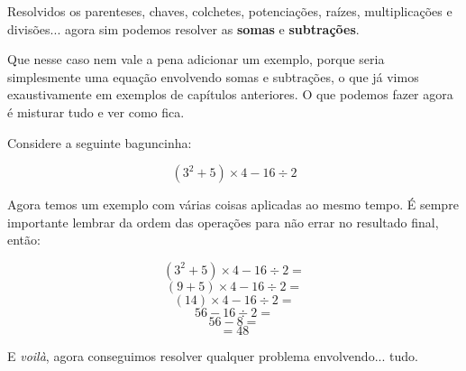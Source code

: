 \begin{tcolorbox}[title = Somas e Subtrações]
    Resolvidos os parenteses, chaves, colchetes, potenciações, raízes, multiplicações e divisões... agora sim podemos resolver as \textbf{somas} e \textbf{subtrações}.
\end{tcolorbox}

Que nesse caso nem vale a pena adicionar um exemplo, porque seria simplesmente uma equação envolvendo somas e subtrações, o que já vimos exaustivamente em exemplos de capítulos anteriores. O que podemos fazer agora é misturar tudo e ver como fica.

\begin{exemplo}
    Considere a seguinte baguncinha:
    
    \begin{equation}
        (3^2+5)\times4-16\div2
    \end{equation}

    Agora temos um exemplo com várias coisas aplicadas ao mesmo tempo. É sempre importante lembrar da ordem das operações para não errar no resultado final, então:

    \begin{equation}
        (3^2+5)\times4-16\div2=
    \end{equation}
    \begin{equation}
        (9+5)\times4-16\div2=
    \end{equation}
    \begin{equation}
        (14)\times4-16\div2=
    \end{equation}
    \begin{equation}
        56-16\div2=
    \end{equation}
    \begin{equation}
        56-8=
    \end{equation}
    \begin{equation}
        =48
    \end{equation}
\end{exemplo}

E \textit{voilà}, agora conseguimos resolver qualquer problema envolvendo... tudo.